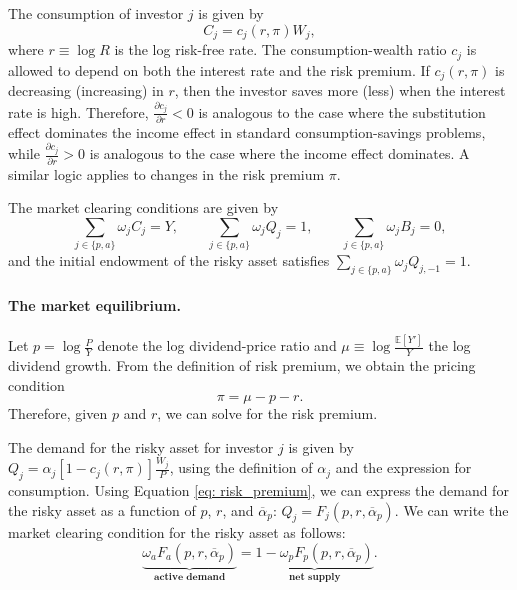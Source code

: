 The consumption of investor $j$ is given by 
\begin{equation}
    C_j = c_{j}( r , \pi) W_j,\nonumber
\end{equation}
where $r \equiv \log R$ is the log risk-free rate. The consumption-wealth ratio $c_j$ is allowed to depend on both the interest rate and the risk premium. 
If $c_{j}(r, \pi)$ is decreasing (increasing) in $r$, then the investor saves more (less) when the interest rate is high.
Therefore, $\frac{\partial c_j}{\partial r}< 0$ is analogous to the case where the substitution effect dominates the income effect in standard consumption-savings problems, while $\frac{\partial c_j}{\partial r} > 0$ is analogous to the case where the income effect dominates. A similar logic applies to changes in the risk premium $\pi$.

The market clearing conditions are given by
\begin{equation}
    \sum_{j\in\{p,a\}} \omega_j C_j = Y, \qquad 
    \sum_{j\in\{p,a\}} \omega_j Q_j = 1, \qquad 
    \sum_{j\in\{p,a\}} \omega_j B_j = 0,\nonumber
\end{equation}
and the initial endowment of the risky asset satisfies $\sum_{j\in\{p,a\}} \omega_j Q_{j,-1} = 1$.

\paragraph{The market equilibrium.} Let $p = \log \frac{P}{Y}$ denote the log dividend-price ratio and $\mu \equiv \log \frac{\mathbb{E}[Y']}{Y}$ the log dividend growth. From the definition of risk premium, we obtain the pricing condition
\begin{equation}\label{eq: risk_premium}
    \pi = \mu - p - r.
\end{equation}
Therefore, given $p$ and $r$, we can solve for the risk premium. 

The demand for the risky asset for investor $j$ is given by $Q_j = \alpha_j [1 - c_{j}(r,\pi)]\frac{W_j}{P}$, using the definition of  $\alpha_j$ and the expression for consumption. Using Equation \eqref{eq: risk_premium}, we can express the demand for the risky asset as a function of $p$, $r$, and $\overline{\alpha}_p$: $Q_j = F_j(p, r, \overline{\alpha}_p)$.  
We can write the market clearing condition for the risky asset as follows:
\begin{equation}\label{eq: risky_mkt}
\underbrace{\omega_a F_a(p, r, \overline{\alpha}_p)}_{\textbf{active demand}}  = \underbrace{1 - \omega_p  F_p(p, r, \overline{\alpha}_p)}_{\textbf{net supply}}.
\end{equation}

